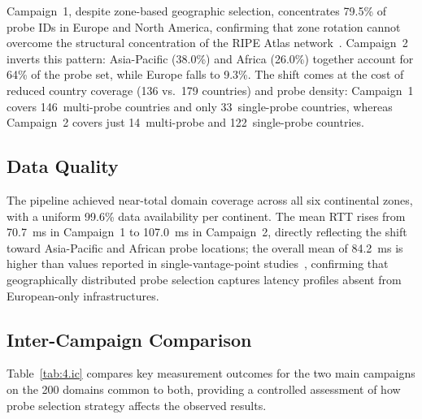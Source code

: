 Campaign~1, despite zone-based geographic selection, concentrates 79.5\% of probe IDs in Europe and North America, confirming that zone rotation cannot overcome the structural concentration of the RIPE Atlas network~\cite{Bajpai2017}. Campaign~2 inverts this pattern: Asia-Pacific (38.0\%) and Africa (26.0\%) together account for 64\% of the probe set, while Europe falls to 9.3\%. The shift comes at the cost of reduced country coverage (136 vs.\ 179 countries) and probe density: Campaign~1 covers 146~multi-probe countries and only 33~single-probe countries, whereas Campaign~2 covers just 14~multi-probe and 122~single-probe countries.

\subsection{Data Quality}
\label{subsec:4.1.3}

The pipeline achieved near-total domain coverage across all six continental zones, with a uniform 99.6\% data availability per continent. The mean \ac{RTT} rises from 70.7~ms in Campaign~1 to 107.0~ms in Campaign~2, directly reflecting the shift toward Asia-Pacific and African probe locations; the overall mean of 84.2~ms is higher than values reported in single-vantage-point studies~\cite{Bajpai2017}, confirming that geographically distributed probe selection captures latency profiles absent from European-only infrastructures.

\subsection{Inter-Campaign Comparison}
\label{subsec:4.1.4}

Table~\ref{tab:4.ic} compares key measurement outcomes for the two main campaigns on the 200 domains common to both, providing a controlled assessment of how probe selection strategy affects the observed results.

